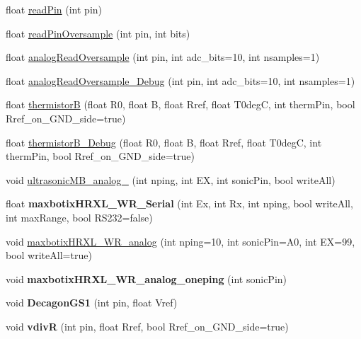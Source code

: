 \begin{DoxyCompactItemize}
\item 
float \hyperlink{classLogger_a343fcabefb37e06429865a2e6a6e708a}{read\+Pin} (int pin)
\item 
float \hyperlink{classLogger_a4e67526c65fa865f276a515a200af4aa}{read\+Pin\+Oversample} (int pin, int bits)
\item 
float \hyperlink{classLogger_afd26c9895a3b0314413c28a9fe236e2a}{analog\+Read\+Oversample} (int pin, int adc\+\_\+bits=10, int nsamples=1)
\item 
float \hyperlink{classLogger_a02c147268f3bd5bd55b8c632c9e5ab9f}{analog\+Read\+Oversample\+\_\+\+Debug} (int pin, int adc\+\_\+bits=10, int nsamples=1)
\item 
float \hyperlink{classLogger_a0b35b861394160fb080afd78a1dea500}{thermistorB} (float R0, float B, float Rref, float T0degC, int therm\+Pin, bool Rref\+\_\+on\+\_\+\+G\+N\+D\+\_\+side=true)
\item 
float \hyperlink{classLogger_aeb80eea2ce978d61a67b1c5904ba4428}{thermistor\+B\+\_\+\+Debug} (float R0, float B, float Rref, float T0degC, int therm\+Pin, bool Rref\+\_\+on\+\_\+\+G\+N\+D\+\_\+side=true)
\item 
void \hyperlink{classLogger_a362a1462166d63ddc613eaa1e86f9854}{ultrasonic\+M\+B\+\_\+analog\+\_\+1cm} (int nping, int EX, int sonic\+Pin, bool write\+All)
\item 
float {\bfseries maxbotix\+H\+R\+X\+L\+\_\+\+W\+R\+\_\+\+Serial} (int Ex, int Rx, int nping, bool write\+All, int max\+Range, bool R\+S232=false)\hypertarget{classLogger_a302ced2e1130c711f4ae1f8b1fc2b2a0}{}\label{classLogger_a302ced2e1130c711f4ae1f8b1fc2b2a0}

\item 
void \hyperlink{classLogger_acd4f2c5017d9a36b88ab345082b4551f}{maxbotix\+H\+R\+X\+L\+\_\+\+W\+R\+\_\+analog} (int nping=10, int sonic\+Pin=A0, int EX=99, bool write\+All=true)
\item 
void {\bfseries maxbotix\+H\+R\+X\+L\+\_\+\+W\+R\+\_\+analog\+\_\+oneping} (int sonic\+Pin)\hypertarget{classLogger_a889b3e76b0f8e21f9a8cc67b35169fdf}{}\label{classLogger_a889b3e76b0f8e21f9a8cc67b35169fdf}

\item 
void {\bfseries Decagon\+G\+S1} (int pin, float Vref)\hypertarget{classLogger_aefe17c5e9cf9b1581c36812d5a87fac1}{}\label{classLogger_aefe17c5e9cf9b1581c36812d5a87fac1}

\item 
void {\bfseries vdivR} (int pin, float Rref, bool Rref\+\_\+on\+\_\+\+G\+N\+D\+\_\+side=true)\hypertarget{classLogger_a1204f15e95e4119774c616807e9736bf}{}\label{classLogger_a1204f15e95e4119774c616807e9736bf}


\end{DoxyCompactItemize}
